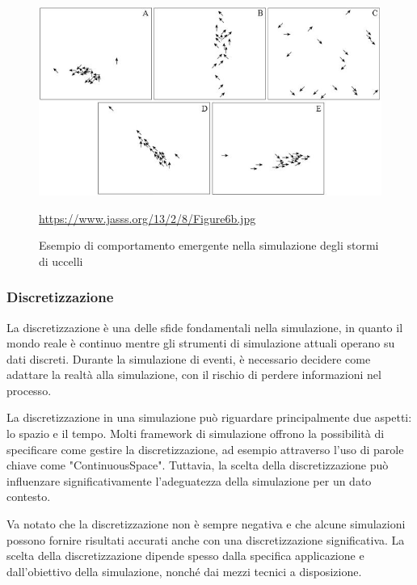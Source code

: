 \begin{figure}[H]
    \begin{center}
        \includegraphics[scale=1]{img/Figure6b.jpg}
        \caption{Esempio di comportamento emergente nella simulazione degli stormi di uccelli}
        \url{https://www.jasss.org/13/2/8/Figure6b.jpg}
        \label{fig:flock_emergent_behaviour}
    \end{center}
\end{figure}

\subsubsection{Discretizzazione}

La discretizzazione è una delle sfide fondamentali nella simulazione, 
in quanto il mondo reale è continuo mentre gli strumenti di simulazione 
attuali operano su dati discreti. Durante la simulazione di eventi, 
è necessario decidere come adattare la realtà alla simulazione, 
con il rischio di perdere informazioni nel processo.

La discretizzazione in una simulazione può riguardare principalmente 
due aspetti: lo spazio e il tempo. Molti framework di simulazione offrono 
la possibilità di specificare come gestire la discretizzazione, 
ad esempio attraverso l'uso di parole chiave come "ContinuousSpace". 
Tuttavia, la scelta della discretizzazione può influenzare 
significativamente l'adeguatezza della simulazione per un dato contesto.

Va notato che la discretizzazione non è sempre negativa e che alcune 
simulazioni possono fornire risultati accurati anche con una 
discretizzazione significativa. La scelta della discretizzazione 
dipende spesso dalla specifica applicazione e dall'obiettivo della simulazione, nonché dai mezzi tecnici a disposizione.

